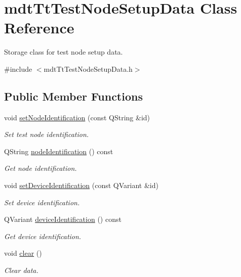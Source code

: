 \hypertarget{classmdt_tt_test_node_setup_data}{\section{mdt\-Tt\-Test\-Node\-Setup\-Data Class Reference}
\label{classmdt_tt_test_node_setup_data}
}


Storage class for test node setup data.  




{\ttfamily \#include $<$mdt\-Tt\-Test\-Node\-Setup\-Data.\-h$>$}

\subsection*{Public Member Functions}
\begin{DoxyCompactItemize}
\item 
void \hyperlink{classmdt_tt_test_node_setup_data_a2faae3ec127611d7ccfd9f4b09d3f235}{set\-Node\-Identification} (const Q\-String \&id)
\begin{DoxyCompactList}\small\item\em Set test node identification. \end{DoxyCompactList}\item 
Q\-String \hyperlink{classmdt_tt_test_node_setup_data_ae67aa6db6cc82bbba059942b3b7bba3b}{node\-Identification} () const 
\begin{DoxyCompactList}\small\item\em Get node identification. \end{DoxyCompactList}\item 
void \hyperlink{classmdt_tt_test_node_setup_data_afa479b37e20659b60489d3efd814a757}{set\-Device\-Identification} (const Q\-Variant \&id)
\begin{DoxyCompactList}\small\item\em Set device identification. \end{DoxyCompactList}\item 
Q\-Variant \hyperlink{classmdt_tt_test_node_setup_data_a506598b487dcc864d03d3be13dd3c88d}{device\-Identification} () const 
\begin{DoxyCompactList}\small\item\em Get device identification. \end{DoxyCompactList}\item 
void \hyperlink{classmdt_tt_test_node_setup_data_a71e59bc329caae7be7e3a3b3e0135353}{clear} ()
\begin{DoxyCompactList}\small\item\em Clear data. \end{DoxyCompactList}\item 

\end{DoxyCompactItemize}
